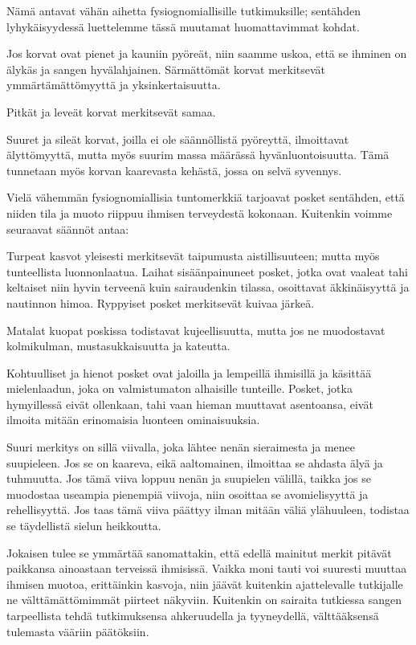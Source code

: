 \documentclass[11pt, twoside, finnish, a5paper]{book}
\begin{document}
Nämä antavat vähän aihetta fysiognomiallisille
tutkimuksille; sentähden lyhykäisyydessä luettelemme tässä
muutamat huomattavimmat kohdat.

Jos korvat ovat pienet ja kauniin pyöreät, niin saamme
uskoa, että se ihminen on älykäs ja sangen hyvälahjainen.
Särmättömät korvat merkitsevät ymmärtämättömyyttä
ja yksinkertaisuutta.

Pitkät ja leveät korvat merkitsevät samaa.

Suuret ja  sileät korvat, joilla ei ole  säännöllistä
pyöreyttä, ilmoittavat älyttömyyttä, mutta myös suurim massa määrässä hyvänluontoisuutta. Tämä tunnetaan myös korvan kaarevasta
kehästä, jossa on selvä syvennys.
 
Vielä vähemmän fysiognomiallisia tuntomerkkiä tarjoavat
posket sentähden, että niiden tila ja muoto
riippuu ihmisen terveydestä kokonaan. Kuitenkin
voimme seuraavat säännöt antaa:

Turpeat kasvot yleisesti merkitsevät taipumusta aistillisuuteen;
mutta myös tunteellista luonnonlaatua. Laihat
sisäänpainuneet posket, jotka ovat vaaleat tahi keltaiset
niin hyvin terveenä kuin sairaudenkin tilassa, osoittavat
äkkinäisyyttä ja nautinnon himoa. Ryppyiset posket merkitsevät
kuivaa järkeä.
 
Matalat kuopat  poskissa todistavat kujeellisuutta,
mutta jos ne muodostavat kolmikulman, mustasukkaisuutta ja kateutta.

Kohtuulliset ja hienot posket ovat jaloilla ja lempeillä
ihmisillä ja käsittää mielenlaadun, joka on valmistumaton
alhaisille tunteille. Posket, jotka hymyillessä eivät
ollenkaan, tahi vaan hieman muuttavat asentoansa,
eivät ilmoita mitään erinomaisia luonteen ominaisuuksia.

Suuri merkitys on sillä viivalla, joka lähtee nenän
sieraimesta ja menee suupieleen. Jos se on kaareva,
eikä aaltomainen, ilmoittaa se ahdasta älyä ja tuhmuutta.
Jos tämä viiva loppuu nenän ja suupielen välillä, taikka
jos se muodostaa useampia pienempiä viivoja, niin
osoittaa se avomielisyyttä ja rehellisyyttä.
 Jos taas tämä viiva päättyy ilman mitään väliä ylähuuleen,
todistaa se täydellistä sielun heikkoutta.

Jokaisen tulee se ymmärtää sanomattakin, että edellä
mainitut merkit pitävät paikkansa ainoastaan terveissä
ihmisissä. Vaikka moni tauti voi suuresti muuttaa ihmisen
muotoa, erittäinkin kasvoja, niin jäävät kuitenkin
ajattelevalle tutkijalle ne välttämättömimmät piirteet näkyviin.
Kuitenkin on sairaita tutkiessa sangen tarpeellista
tehdä tutkimuksensa ahkeruudella ja tyyneydellä,
välttääksensä tulemasta vääriin päätöksiin.
\end{document}
